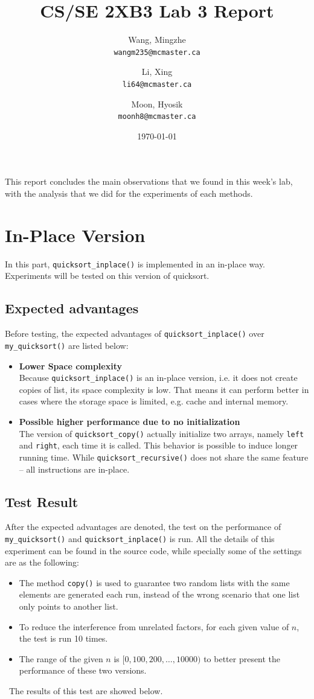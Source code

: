\documentclass[12pt]{article}
\title{CS/SE 2XB3 Lab 3 Report}
\author{
  Wang, Mingzhe\\
  \texttt{wangm235@mcmaster.ca}
  \and
  Li, Xing\\
  \texttt{li64@mcmaster.ca}
  \and
  Moon, Hyosik\\
  \texttt{moonh8@mcmaster.ca}
  }
\date{\today}
\begin{document}
\maketitle

This report concludes the main observations that we found in this week's lab, with the analysis that we did for the experiments of each methods.

\section{In-Place Version}
In this part, \verb|quicksort_inplace()| is implemented in an in-place way. Experiments will be tested on this version of quicksort.

\subsection{Expected advantages}
Before testing, the expected advantages of \verb|quicksort_inplace()| over \verb|my_quicksort()| are listed below:
\begin{itemize}
\item \textbf{Lower Space complexity}\\ Because \verb|quicksort_inplace()| is an in-place version, i.e. it does not create copies of list, its space complexity is low. That means it can perform better in cases where the storage space is limited, e.g. cache and internal memory.
\item \textbf{Possible higher performance due to no initialization}\\ The version of \verb|quicksort_copy()| actually initialize two arrays, namely \verb|left| and \verb|right|, each time it is called. This behavior is possible to induce longer running time. While \verb|quicksort_recursive()| does not share the same feature \--- all instructions are in-place.
\end{itemize}

\subsection{Test Result}
After the expected advantages are denoted, the test on the performance of \verb|my_quicksort()| and  \verb|quicksort_inplace()| is run. All the details of this experiment can be found in the source code, while specially some of the settings are as the following:
\begin{itemize}
\item The method \verb|copy()| is used to guarantee two random lists with the same elements are generated each run, instead of the wrong scenario that one list only points to another list.
\item To reduce the interference from unrelated factors, for each given value of $n$, the test is run 10 times.
\item The range of the given $n$ is $[0, 100, 200, \ldots, 10000)$ to better present the performance of these two versions.
\end{itemize}
~\newline\noindent The results of this test are showed below.
\end{document}
